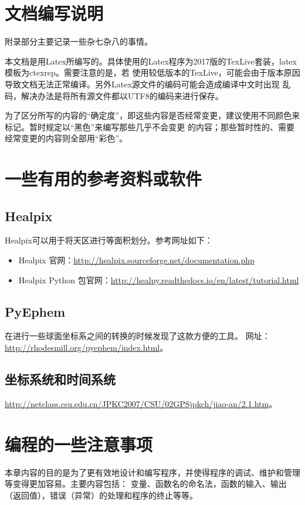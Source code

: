 
\begin{appendix}

\chapter{文档编写说明}
附录部分主要记录一些杂七杂八的事情。

本文档是用Latex所编写的。具体使用的Latex程序为2017版的TexLive套装，latex模板为ctexrep。需要注意的是，若
使用较低版本的TexLive，可能会由于版本原因导致文档无法正常编译。另外Latex源文件的编码可能会造成编译中文时出现
乱码，解决办法是将所有源文件都以UTF8的编码来进行保存。

为了区分所写的内容的“确定度”，即这些内容是否经常变更，建议使用不同颜色来标记。暂时规定以“黑色”来编写那些几乎不会变更
的内容；那些暂时性的、需要经常变更的内容则全部用“彩色”。


\chapter{一些有用的参考资料或软件}

\section{Healpix}
Healpix可以用于将天区进行等面积划分。参考网址如下：
\begin{itemize}
\item Healpix 官网：\url{http://healpix.sourceforge.net/documentation.php}
\item Healpix Python 包官网：\url{http://healpy.readthedocs.io/en/latest/tutorial.html}
\end{itemize}

\section{PyEphem}
在进行一些球面坐标系之间的转换的时候发现了这款方便的工具。
网址：\url{http://rhodesmill.org/pyephem/index.html}。

\section{坐标系统和时间系统}
\url{http://netclass.csu.edu.cn/JPKC2007/CSU/02GPSjpkch/jiao-an/2.1.htm}。



\chapter{编程的一些注意事项}
本章内容的目的是为了更有效地设计和编写程序，并使得程序的调试、维护和管理等变得更加容易。主要内容包括：
变量、函数名的命名法，函数的输入、输出（返回值），错误（异常）的处理和程序的终止等等。


\end{appendix}

